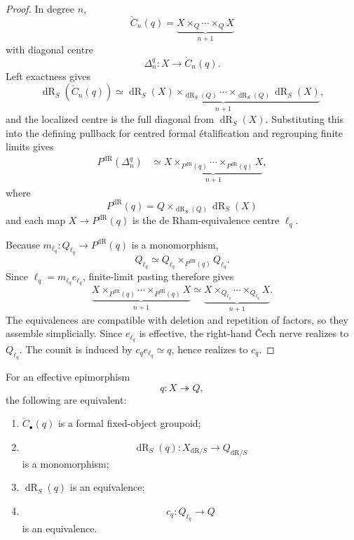 \begin{proof}
In degree $n$,
\[
    \check C_n(q)
    =
    \underbrace{X\times_Q\cdots\times_QX}_{n+1}
\]
with diagonal centre
\[
    \Delta_n^q:X\longrightarrow\check C_n(q).
\]
Left exactness gives
\[
    \operatorname{dR}_S(\check C_n(q))
    \simeq
    \underbrace{
    \operatorname{dR}_S(X)\times_{\operatorname{dR}_S(Q)}\cdots\times_{\operatorname{dR}_S(Q)}\operatorname{dR}_S(X)
    }_{n+1},
\]
and the localized centre is the full diagonal from $\operatorname{dR}_S(X)$.  Substituting
this into the defining pullback for centred formal \'etalification and regrouping finite
limits gives
\[
\begin{aligned}
    P^{\mathrm{dR}}(\Delta_n^q)
    &\simeq
    \underbrace{
    X\times_{P^{\mathrm{dR}}(q)}\cdots\times_{P^{\mathrm{dR}}(q)}X
    }_{n+1},
\end{aligned}
\]
where
\[
    P^{\mathrm{dR}}(q)
    =
    Q\times_{\operatorname{dR}_S(Q)}\operatorname{dR}_S(X)
\]
and each map $X\to P^{\mathrm{dR}}(q)$ is the de Rham-equivalence centre $\ell_q$.

Because $m_{\ell_q}:Q_{\ell_q}\to P^{\mathrm{dR}}(q)$ is a monomorphism,
\[
    Q_{\ell_q}
    \simeq
    Q_{\ell_q}\times_{P^{\mathrm{dR}}(q)}Q_{\ell_q}.
\]
Since $\ell_q=m_{\ell_q}e_{\ell_q}$, finite-limit pasting therefore gives
\[
    \underbrace{X\times_{P^{\mathrm{dR}}(q)}\cdots\times_{P^{\mathrm{dR}}(q)}X}_{n+1}
    \simeq
    \underbrace{
    X\times_{Q_{\ell_q}}\cdots
    \times_{Q_{\ell_q}}X
    }_{n+1}.
\]
The equivalences are compatible with deletion and repetition of factors, so
they assemble simplicially.  Since $e_{\ell_q}$ is effective, the right-hand
\v{C}ech nerve realizes to $Q_{\ell_q}$.  The counit is induced by
$c_qe_{\ell_q}\simeq q$, hence realizes to $c_q$.
\end{proof}

\begin{theorem}
\label{thm:formal-quotient-monomorphism-recognition}
For an effective epimorphism
\[
    q:X\twoheadrightarrow Q,
\]
the following are equivalent:
\begin{enumerate}
    \item $\check C_\bullet(q)$ is a formal fixed-object groupoid;
    \item
    \[
        \operatorname{dR}_S(q):
        X_{\mathrm{dR}/S}
        \longrightarrow
        Q_{\mathrm{dR}/S}
    \]
    is a monomorphism;
    \item $\operatorname{dR}_S(q)$ is an equivalence;
    \item
    \[
        c_q:Q_{\ell_q}\longrightarrow Q
    \]
    is an equivalence.
\end{enumerate}
\end{theorem}

